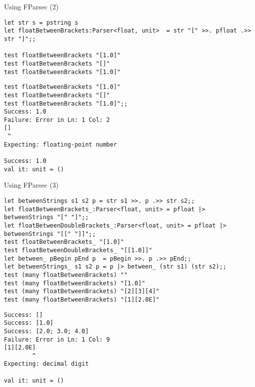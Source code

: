 \documentclass[t]{beamer}
\begin{document}
\begin{frame}[label={sec:orgfce0df4},fragile]{Using FParsec (2)}
 \begin{verbatim}
let str s = pstring s
let floatBetweenBrackets:Parser<float, unit>  = str "[" >>. pfloat .>> str "]";;

test floatBetweenBrackets "[1.0]"
test floatBetweenBrackets "[]"
test floatBetweenBrackets "[1.0]"
\end{verbatim}

\begin{verbatim}
test floatBetweenBrackets "[1.0]"
test floatBetweenBrackets "[]"
test floatBetweenBrackets "[1.0]";;
Success: 1.0                            
Failure: Error in Ln: 1 Col: 2
[]
 ^
Expecting: floating-point number

Success: 1.0                            
val it: unit = ()
\end{verbatim}
\end{frame}

\begin{frame}[label={sec:org8356b84},fragile]{Using FParsec (3)}
 \begin{verbatim}
let betweenStrings s1 s2 p = str s1 >>. p .>> str s2;;
let floatBetweenBrackets_:Parser<float, unit> = pfloat |> betweenStrings "[" "]";;
let floatBetweenDoubleBrackets_:Parser<float, unit> = pfloat |> betweenStrings "[[" "]]";;
test floatBetweenBrackets_ "[1.0]"
test floatBetweenDoubleBrackets_ "[[1.0]]"
let between_ pBegin pEnd p  = pBegin >>. p .>> pEnd;;
let betweenStrings_ s1 s2 p = p |> between_ (str s1) (str s2);;
test (many floatBetweenBrackets) ""
test (many floatBetweenBrackets) "[1.0]"
test (many floatBetweenBrackets) "[2][3][4]"
test (many floatBetweenBrackets) "[1][2.0E]"
\end{verbatim}

\begin{verbatim}
Success: []
Success: [1.0]
Success: [2.0; 3.0; 4.0]
Failure: Error in Ln: 1 Col: 9
[1][2.0E]
        ^
Expecting: decimal digit

val it: unit = ()
\end{verbatim}
\end{frame}
\end{document}
